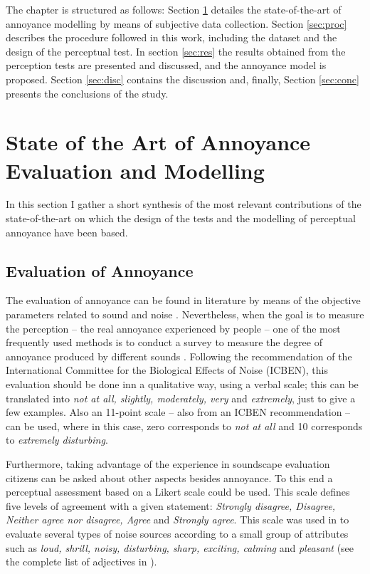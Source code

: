  The chapter is structured as follows: Section \ref{sec:mod} detailes the state-of-the-art of annoyance modelling by means of subjective data collection. Section \ref{sec:proc} describes the procedure followed in this work, including the dataset and the design of the perceptual test. In section \ref{sec:res} the results obtained from the perception tests are presented and discussed, and the annoyance model is proposed. Section \ref{sec:disc} contains the discussion and, finally, Section \ref{sec:conc} presents the conclusions of the study.

\section{State of the Art of Annoyance Evaluation and Modelling}
 \label{sec:mod}
 In this section I gather a short synthesis of the most relevant contributions of the state-of-the-art on which the design of the tests and the modelling of perceptual annoyance have been based.

 \subsection{Evaluation of Annoyance}
   The evaluation of annoyance can be found in literature by means of the objective parameters related to sound and noise . Nevertheless, when the goal is to measure the perception -- the real annoyance experienced by people -- one of the most frequently used methods is to conduct a survey to measure the degree of annoyance produced by different sounds . Following the recommendation of the International Committee for the Biological Effects of Noise (ICBEN), this evaluation should be done inn a qualitative way, using a verbal scale; this can be translated into \emph{not at all, slightly, moderately, very} and \emph{extremely}, just to give a few examples. Also an 11-point scale -- also from an ICBEN recommendation -- can be used, where in this case, zero corresponds to \emph{not at all} and 10 corresponds to \emph{extremely disturbing}.

   Furthermore, taking advantage of the experience in soundscape evaluation  citizens can be asked about other aspects besides annoyance. To this end a perceptual assessment based on a Likert scale  could be used. This scale defines five levels of agreement with a given statement: \emph{Strongly disagree, Disagree, Neither agree nor disagree, Agree} and \emph{Strongly agree}. This scale was used in  to evaluate several types of noise sources according to a small group of attributes such as \emph{loud, shrill, noisy, disturbing, sharp, exciting, calming} and \emph{pleasant} (see the complete list of adjectives in ).

